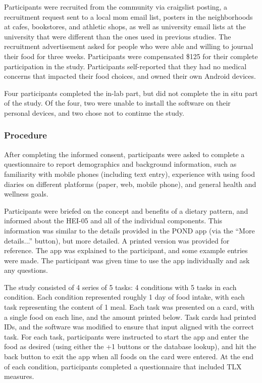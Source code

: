 Participants were recruited from the community via craigslist posting, a recruitment request sent to a local mom email list, posters in the neighborhoods at cafes, bookstores, and athletic shops, as well as university email lists at the university that were different than the ones used in previous studies. The recruitment advertisement asked for people who were able and willing to journal their food for three weeks. Participants were compensated \$125 for their complete participation in the study. Participants self-reported that they had no medical concerns that impacted their food choices, and owned their own Android devices. 

Four participants completed the in-lab part, but did not complete the in situ part of the study. Of the four, two were unable to install the software on their personal devices, and two chose not to continue the study. 

\subsubsection{Procedure}
After completing the informed consent, participants were asked to complete a questionnaire to report demographics and background information, such as familiarity with mobile phones (including text entry), experience with using food diaries on different platforms (paper, web, mobile phone), and general health and wellness goals. 

Participants were briefed on the concept and benefits of a dietary pattern, and informed about the HEI-05 and all of the individual components. This information was similar to the details provided in the POND app (via the ``More details...'' button), but more detailed. A printed version was provided for reference. The app was explained to the participant, and some example entries were made. The participant was given time to use the app individually and ask any questions. 

The study consisted of 4 series of 5 tasks: 4 conditions with 5 tasks in each condition. Each condition represented roughly 1 day of food intake, with each task representing the content of 1 meal. Each task was presented on a card, with a single food on each line, and the amount printed below. Task cards had printed IDs, and the software was modified to ensure that input aligned with the correct task. For each task, participants were instructed to start the app and enter the food as desired (using either the +1 buttons or the database lookup), and hit the back button to exit the app when all foods on the card were entered.  At the end of each condition, participants completed a questionnaire that included TLX measures. 

